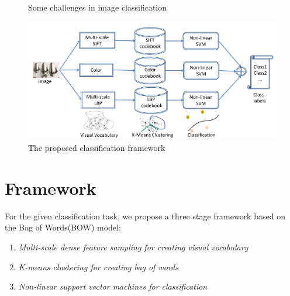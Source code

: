 \documentclass[12pt]{article}
\begin{document}
\begin{figure}
{\label{fig1:subfig3}
}
\caption{Some challenges in image classification}
\end{figure}

\begin{figure}
\includegraphics[width = 1\textwidth]{flowchart}
\caption{The proposed classification framework}
\end{figure}

\section{Framework}
For the given classification task, we propose a three stage framework based on the Bag of Words(BOW) model:
\begin{enumerate}
\item \textit{Multi-scale dense feature sampling for creating visual vocabulary}
\item \textit{K-means clustering for creating bag of words}
\item \textit{Non-linear support vector machines for classification}
\end{enumerate}



\end{document}

